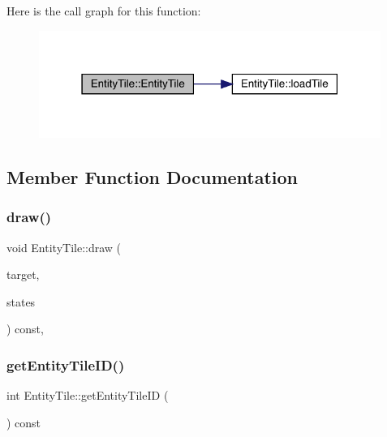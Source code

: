 Here is the call graph for this function\+:
\nopagebreak
\begin{figure}[H]
\begin{center}
\leavevmode
\includegraphics[width=316pt]{d7/dd4/class_entity_tile_a7339ed82b7f4d506ef34f99b1446714a_cgraph}
\end{center}
\end{figure}


\subsection{Member Function Documentation}
\mbox{\label{class_entity_tile_a1d61eb82fed61b1c7aebc54249bd7c80}} 
\subsubsection{\texorpdfstring{draw()}{draw()}}
{\footnotesize\ttfamily void Entity\+Tile\+::draw (\begin{DoxyParamCaption}\item[{sf\+::\+Render\+Target \&}]{target,  }\item[{sf\+::\+Render\+States}]{states }\end{DoxyParamCaption}) const\hspace{0.3cm}{\ttfamily [private]}, {\ttfamily [virtual]}}

\mbox{\label{class_entity_tile_ae03bd8f12e01ddeb289be1b7229386ca}} 
\subsubsection{\texorpdfstring{get\+Entity\+Tile\+I\+D()}{getEntityTileID()}}
{\footnotesize\ttfamily int Entity\+Tile\+::get\+Entity\+Tile\+ID (\begin{DoxyParamCaption}{ }\end{DoxyParamCaption}) const}

